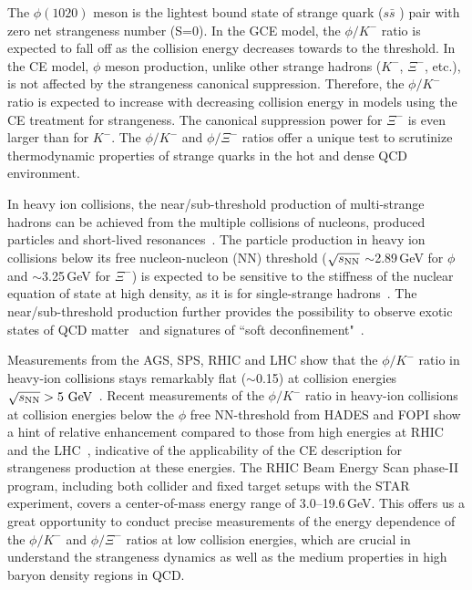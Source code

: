\documentclass[%
 reprint,	
showpacs,
 amsmath,amssymb,
 aps,
 superscriptaddress,
]{revtex4-1}
\begin{document}
The $\phi(1020)$ meson is the lightest bound state of strange quark ($s\bar{s}$ ) pair with zero net strangeness number (S=0). %
In the GCE model, the $\phi/K^-$ ratio is expected to fall off as the collision energy decreases towards to the threshold. In the CE model, $\phi$ meson production, unlike other strange hadrons ($K^-$, $\Xi^-$, etc.), is not affected by the strangeness canonical suppression.
Therefore, the $\phi/K^-$ ratio is expected to increase with decreasing collision energy in models using the CE treatment for strangeness. The canonical suppression power for $\Xi^-$ is even larger than for $K^-$. The $\phi/K^-$ and $\phi/\Xi^-$ ratios offer a unique test to scrutinize thermodynamic properties of strange quarks in the hot and dense QCD environment.

In heavy ion collisions, the near/sub-threshold production of multi-strange hadrons can be achieved from the multiple collisions of nucleons, produced particles and short-lived resonances~\cite{ZEEB2004297}. The particle production in heavy ion collisions below its free nucleon-nucleon (NN) threshold ($\sqrt{s_{\rm NN}}$ $\sim$2.89\,GeV for $\phi$ and $\sim$3.25\,GeV for $\Xi^-$) is expected to be sensitive to the stiffness of the nuclear equation of state at high density, as it is for single-strange hadrons~\cite{KO.PhysRevLett.55.2661,FUCHS20061_kaons}. The near/sub-threshold production further provides the possibility
to observe exotic states of QCD matter~\cite{McLerran:2007qj} and signatures of ``soft deconfinement"~\cite{Fukushima:2020cmk}.
 
Measurements from the AGS, SPS, RHIC and LHC show that the $\phi/K^-$ ratio in heavy-ion collisions stays remarkably flat ($\sim$0.15) at collision energies ${\sqrt{s_{\rm NN}} > \textup{5 GeV}}$~\cite{E917_phi,NA49_phi,star_bes_strangeness}. Recent measurements of the $\phi/K^-$ ratio in heavy-ion collisions at collision energies below the $\phi$ free NN-threshold from HADES and FOPI show a hint of relative enhancement compared to those from high energies at RHIC and the LHC~\cite{FOPI_phi_AlAl,FOPI_phi_NiNi,HADES_phi_ArKCl,HADES_phi_AuAu}, indicative of the applicability of the CE description for strangeness production at these energies. %
The RHIC Beam Energy Scan phase-II program, including both collider and fixed target setups with the STAR experiment, covers a center-of-mass energy range of 3.0--19.6\,GeV. This offers us a great opportunity to conduct precise measurements of the energy dependence of the $\phi/K^-$ and $\phi/\Xi^-$ ratios at low collision energies, which are crucial in understand the strangeness dynamics as well as the medium properties in high baryon density regions in QCD.
\end{document}
